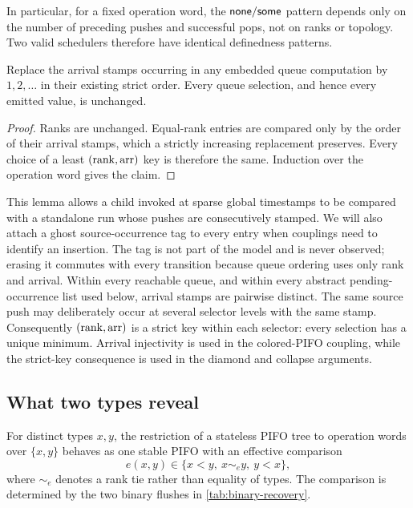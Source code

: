 In particular, for a fixed operation word, the \(\mathsf{none}/\mathsf{some}\) pattern depends
only on the number of preceding pushes and successful pops, not on ranks or
topology.  Two valid schedulers therefore have identical definedness patterns.

\begin{lemma}
\label{lem:compression}
Replace the arrival stamps occurring in any embedded queue computation by
\(1,2,\ldots\) in their existing strict order.  Every queue selection, and
hence every emitted value, is unchanged.
\end{lemma}

\begin{proof}
Ranks are unchanged.  Equal-rank entries are compared only by the order of
their arrival stamps, which a strictly increasing replacement preserves.
Every choice of a least \((\operatorname{rank},\operatorname{arr})\) key is therefore the same.  Induction
over the operation word gives the claim.
\end{proof}

This lemma allows a child invoked at sparse global timestamps to be compared
with a standalone run whose pushes are consecutively stamped.  We will also
attach a ghost source-occurrence tag to every entry when couplings need to
identify an insertion.  The tag is not part of the model and is never
observed; erasing it commutes with every transition because queue ordering uses
only rank and arrival.  Within every reachable queue, and within every abstract
pending-occurrence list used below, arrival stamps are pairwise distinct.  The
same source push may deliberately occur at several selector levels with the
same stamp.  Consequently \((\operatorname{rank},\operatorname{arr})\) is a strict key within each
selector: every selection has a unique minimum.  Arrival injectivity is used
in the colored-PIFO coupling, while the strict-key consequence is used in the
diamond and collapse arguments.

\subsection{What two types reveal}

\begin{lemma}
\label{lem:two-type}
For distinct types \(x,y\), the restriction of a stateless PIFO tree to
operation words over \(\{x,y\}\) behaves as one stable PIFO with an effective
comparison
\[
  e(x,y)\in\{x<y,\ x\sim_e y,\ y<x\},
\]
where \(\sim_e\) denotes a rank tie rather than equality of types.
The comparison is determined by the two binary flushes in
\autoref{tab:binary-recovery}.
\end{lemma}

